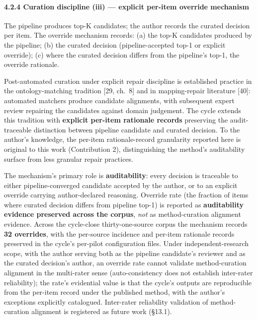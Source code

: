 \documentclass[
]{article}
\begin{document}
\paragraph{4.2.4 Curation discipline (iii) --- explicit per-item
override
mechanism}\label{curation-discipline-iii-explicit-per-item-override-mechanism}

The pipeline produces top-K candidates; the author records the curated
decision per item. The override mechanism records: (a) the top-K
candidates produced by the pipeline; (b) the curated decision
(pipeline-accepted top-1 or explicit override); (c) where the curated
decision differs from the pipeline's top-1, the override rationale.

Post-automated curation under explicit repair discipline is established
practice in the ontology-matching tradition {[}29, ch.~8{]} and in
mapping-repair literature {[}40{]}: automated matchers produce candidate
alignments, with subsequent expert review repairing the candidates
against domain judgement. The cycle extends this tradition with
\textbf{explicit per-item rationale records} preserving the
audit-traceable distinction between pipeline candidate and curated
decision. To the author's knowledge, the per-item rationale-record
granularity reported here is original to this work (Contribution 2),
distinguishing the method's auditability surface from less granular
repair practices.

The mechanism's primary role is \textbf{auditability}: every decision is
traceable to either pipeline-converged candidate accepted by the author,
or to an explicit override carrying author-declared reasoning. Override
rate (the fraction of items where curated decision differs from pipeline
top-1) is reported as \textbf{auditability evidence preserved across the
corpus}, \emph{not} as method-curation alignment evidence. Across the
cycle-close thirty-one-source corpus the mechanism records \textbf{32
overrides}, with the per-source incidence and per-item rationale records
preserved in the cycle's per-pilot configuration files. Under
independent-research scope, with the author serving both as the pipeline
candidate's reviewer and as the curated decision's author, an override
rate cannot validate method-curation alignment in the multi-rater sense
(auto-consistency does not establish inter-rater reliability); the
rate's evidential value is that the cycle's outputs are reproducible
from the per-item record under the published method, with the author's
exceptions explicitly catalogued. Inter-rater reliability validation of
method-curation alignment is registered as future work (§13.1).
\end{document}

